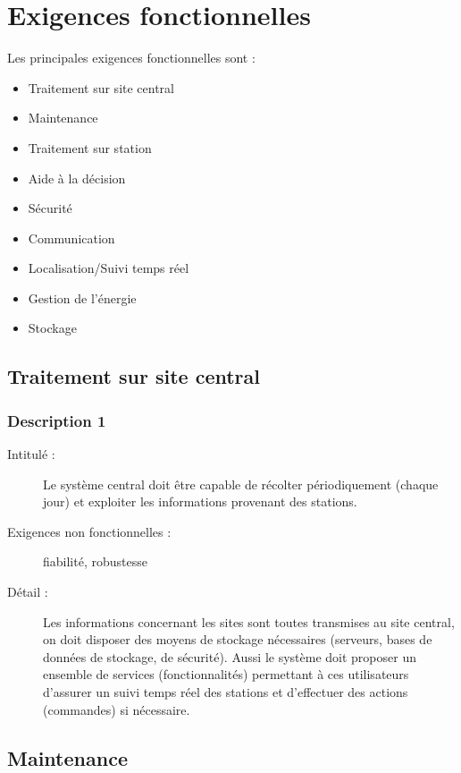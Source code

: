 \section{Exigences fonctionnelles}

Les principales exigences fonctionnelles sont :
 \begin{itemize}
       \item Traitement sur site central
       \item Maintenance
       \item Traitement sur station
       \item Aide à la décision
       \item Sécurité
       \item Communication
       \item Localisation/Suivi temps réel
       \item Gestion de l'énergie
       \item Stockage
\end{itemize}


\subsection {Traitement sur site central }
\subsubsection {Description 1}
\begin{description}
           \item[Intitulé :] Le système central doit être capable de récolter périodiquement (chaque jour) et exploiter les informations provenant des stations.
           \item[Exigences non fonctionnelles :]  fiabilité, robustesse
           \item[Détail :]  Les informations concernant les sites sont toutes transmises au site central, on doit disposer des moyens
de stockage nécessaires (serveurs, bases de données de stockage, de sécurité). Aussi le système doit proposer un ensemble de services (fonctionnalités) permettant à ces utilisateurs d'assurer un suivi temps réel des stations et d'effectuer des actions (commandes) si nécessaire.
\end{description}


 \subsection {Maintenance}
